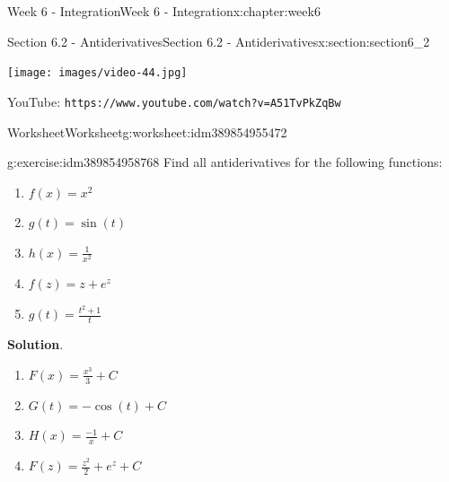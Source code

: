 \documentclass[oneside,10pt,]{book}
\newcommand{\blocktitlefont}{\relax}
\newcommand{\mono}[1]{\texttt{#1}}
\numberwithin{equation}{section}
\newlength{\qrsize}
\newlength{\previewwidth}
\begin{document}
\begin{chapterptx}{Week 6 - Integration}{}{Week 6 - Integration}{}{}{x:chapter:week6}
\begin{sectionptx}{Section 6.2 - Antiderivatives}{}{Section 6.2 - Antiderivatives}{}{}{x:section:section6_2}
\setlength{\qrsize}{9em}
\setlength{\previewwidth}{\linewidth}
\addtolength{\previewwidth}{-\qrsize}
\begin{tcbraster}[raster columns=2, raster column skip=1pt, raster halign=center, raster force size=false, raster left skip=0pt, raster right skip=0pt]%
\begin{tcolorbox}[previewstyle, width=\previewwidth]%
\texttt{[image: images/video-44.jpg]}%
\end{tcolorbox}%
\begin{tcolorbox}[qrstyle]%
{\hypersetup{urlcolor=black}}%
\end{tcolorbox}%
\begin{tcolorbox}[captionstyle]%
\small YouTube: \mono{https://www.youtube.com/watch?v=A51TvPkZqBw}\end{tcolorbox}%
\end{tcbraster}%
%
%
\typeout{************************************************}
\typeout{************************************************}
%
\begin{worksheet-subsection}{Worksheet}{}{Worksheet}{}{}{g:worksheet:idm389854955472}
\begin{divisionexercise}{1}{}{}{g:exercise:idm389854958768}%
Find all antiderivatives for the following functions:%
%
\begin{enumerate}[label=(\alph*)]
\item{}\(\displaystyle f(x)=x^2\)%
\item{}\(\displaystyle g(t)=\sin(t)\)%
\item{}\(\displaystyle h(x)=\frac{1}{x^2}\)%
\item{}\(\displaystyle f(z)= z+e^z\)%
\item{}\(\displaystyle g(t)=\frac{t^2+1}{t}\)%
\end{enumerate}
\textbf{\blocktitlefont Solution}.\hypertarget{g:solution:idm389854978848}{}\quad{}%
\begin{enumerate}[label=(\alph*)]
\item{}\(\displaystyle F(x)=\frac{x^3}{3}+C\)%
\item{}\(\displaystyle G(t)=-\cos(t)+C\)%
\item{}\(\displaystyle H(x)=\frac{-1}{x}+C\)%
\item{}\(\displaystyle F(z)= \frac{z^2}{2}+e^z+C\)%

\end{enumerate}
\end{divisionexercise}
\end{worksheet-subsection}
\end{sectionptx}
\end{chapterptx}
\end{document}

